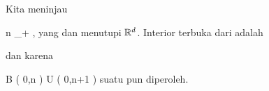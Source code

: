 Kita meninjau

 {}
 {n \in \N_+} {}
 {} {} {} {,}
yang
dan menutupi ${\mathbb R}^d$. Interior terbuka dari
adalah

 dan karena

\mavergleichskettedisp
{\vergleichskette
{ B  \left(  0,n \right)
}
{ \subseteq} { U \left(   0,n+1  \right)
}
{ } {
}
{ } {
}
{ } {
}
}
{}{}{}
suatu
pun diperoleh.
